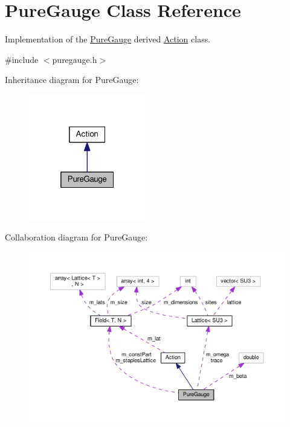 \hypertarget{classPureGauge}{}\section{Pure\+Gauge Class Reference}
\label{classPureGauge}


Implementation of the \hyperlink{classPureGauge}{Pure\+Gauge} derived \hyperlink{classAction}{Action} class.  




{\ttfamily \#include $<$puregauge.\+h$>$}



Inheritance diagram for Pure\+Gauge\+:\nopagebreak
\begin{figure}[H]
\begin{center}
\leavevmode
\includegraphics[width=145pt]{d8/da5/classPureGauge__inherit__graph}
\end{center}
\end{figure}


Collaboration diagram for Pure\+Gauge\+:\nopagebreak
\begin{figure}[H]
\begin{center}
\leavevmode
\includegraphics[width=350pt]{da/d42/classPureGauge__coll__graph}
\end{center}
\end{figure}
